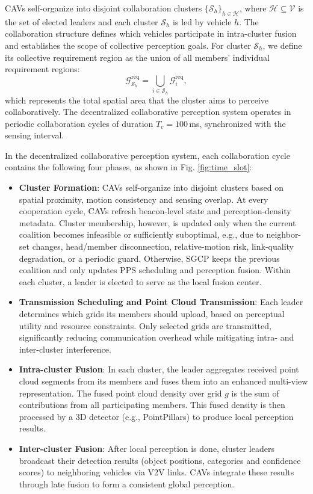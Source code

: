 \documentclass[conference]{IEEEtran}
\begin{document}
CAVs self-organize into disjoint collaboration clusters $\{\mathcal{S}_h\}_{h \in \mathcal{H}}$, where $\mathcal{H} \subseteq \mathcal{V}$ is the set of elected leaders and each cluster $\mathcal{S}_h$ is led by vehicle $h$.  
The collaboration structure defines which vehicles participate in intra-cluster fusion and establishes the scope of collective perception goals. 
For cluster $\mathcal{S}_h$, we define its collective requirement region as the union of all members’ individual requirement regions:
\begin{equation}
\mathcal{G}_{\mathcal{S}_h}^{\mathrm{req}} = \bigcup_{i \in \mathcal{S}_h} \mathcal{G}_i^{\mathrm{req}},
\end{equation}
which represents the total spatial area that the cluster aims to perceive collaboratively.
The decentralized collaborative perception system operates in periodic collaboration cycles of duration $T_c = 100$\,ms, synchronized with the sensing interval. 

In the decentralized collaborative perception system, each collaboration cycle contains the following four phases, as shown in Fig. \ref{fig:time_slot}:
\begin{itemize}
    \item \textbf{Cluster Formation}: 
    CAVs self-organize into disjoint clusters based on spatial proximity, motion consistency and sensing overlap. 
    At every cooperation cycle, CAVs refresh beacon-level state and perception-density metadata. Cluster membership, however, is updated only when the current coalition becomes infeasible or sufficiently suboptimal, e.g., due to neighbor-set changes, head/member disconnection, relative-motion risk, link-quality degradation, or a periodic guard. Otherwise, SGCP keeps the previous coalition and only updates PPS scheduling and perception fusion.
    Within each cluster, a leader is elected to serve as the local fusion center.

    \item \textbf{Transmission Scheduling and Point Cloud Transmission}: 
    Each leader determines which grids its members should upload, based on perceptual utility and resource constraints. 
    Only selected grids are transmitted, significantly reducing communication overhead while mitigating intra- and inter-cluster interference.

    \item \textbf{Intra-cluster Fusion}: 
    In each cluster, the leader aggregates received point cloud segments from its members and fuses them into an enhanced multi-view representation. 
    The fused point cloud density over grid $g$ is the sum of contributions from all participating members. 
    This fused density is then processed by a 3D detector (e.g., PointPillars) to produce local perception results.

    \item \textbf{Inter-cluster Fusion}: 
    After local perception is done, cluster leaders broadcast their detection results (object positions, categories and confidence scores) to neighboring vehicles via V2V links. 
    CAVs integrate these results through late fusion to form a consistent global perception.
\end{itemize}
\end{document}
